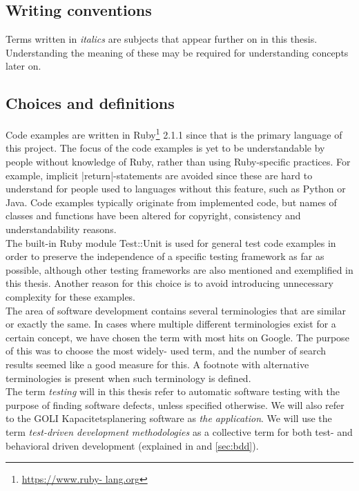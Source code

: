 \MakeShortVerb{\|}

\subsection{Writing conventions}

Terms written in \emph{italics} are subjects that appear further on in
this thesis. Understanding the meaning of these may be required for
understanding concepts later on.\\


\subsection{Choices and definitions}

Code examples are written in Ruby\footnote{\url{https://www.ruby-
lang.org}} 2.1.1 since that is the primary language of this project. The
focus of the code examples is yet to be understandable by people without
knowledge of Ruby, rather than using Ruby-specific practices. For
example, implicit |return|-statements are avoided since these are
hard to understand for people used to languages without this feature,
such as Python or Java. Code examples typically originate from
implemented code, but names of classes and functions have been altered
for copyright, consistency and understandability reasons.\\

The built-in Ruby module Test::Unit is used for general test code
examples in order to preserve the independence of a specific testing
framework as far as possible, although other testing frameworks are also
mentioned and exemplified in this thesis. Another reason for this choice
is to avoid introducing unnecessary complexity for these examples.\\

The area of software development contains several terminologies that are
similar or exactly the same. In cases where multiple different
terminologies exist for a certain concept, we have chosen the term with
most hits on Google. The purpose of this was to choose the most widely-
used term, and the number of search results seemed like a good measure
for this. A footnote with alternative terminologies is present when
such terminology is defined.\\

The term \emph{testing} will in this thesis refer to automatic software
testing with the purpose of finding software defects, unless specified
otherwise. We will also refer to the GOLI Kapacitetsplanering software
as \emph{the application}. We will use the term \emph{test-driven
development methodologies} as a collective term for both test- and
behavioral driven development (explained in  and
\ref{sec:bdd}).\\
